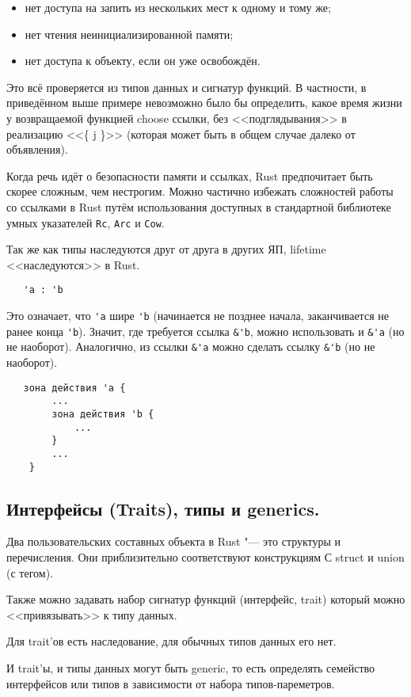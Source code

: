 \documentclass[10pt, a5paper]{article}
\begin{document}
\begin{itemize}
  \item нет доступа на запить из нескольких мест к одному и тому же;
  \item нет чтения неинициализированной памяти;
  \item нет доступа к объекту, если он уже освобождён.
\end{itemize}

Это всё проверяется из типов данных и сигнатур функций. В частности,
в приведённом выше примере невозможно было бы определить, какое время жизни у возвращаемой функцией choose ссылки, без <<подглядывания>> в реализацию <<\{ j \}>> (которая может быть в общем случае далеко от объявления).

Когда речь идёт о безопасности памяти и ссылках, Rust предпочитает быть скорее сложным, чем нестрогим. Можно частично избежать сложностей работы со ссылками в Rust путём использования доступных в стандартной библиотеке умных указателей \verb!Rc!, \verb!Arc! и \verb!Cow!.

Так же как типы наследуются друг от друга в других ЯП, lifetime <<наследуются>> в Rust.

\begin{verbatim}
   'a : 'b\end{verbatim}
Это означает, что \verb!'a! шире \verb!'b! (начинается не позднее начала, заканчивается не ранее конца \verb!'b!). Значит, где требуется ссылка \verb!&'b!,
можно использовать и \verb!&'a! (но не наоборот). Аналогично, из ссылки \verb!&'a! можно сделать ссылку \verb!&'b! (но не наоборот).

\begin{verbatim}
   зона действия 'a {
        ...
        зона действия 'b {
            ...
        }
        ...
    }\end{verbatim}
\subsection*{Интерфейсы (Traits), типы и generics.}

Два пользовательских составных объекта в Rust "--- это структуры и перечисления. Они приблизительно соответствуют конструкциям С struct и union (с тегом).

Также можно задавать набор сигнатур функций (интерфейс, trait) который можно <<привязывать>> к типу данных.

Для trait'ов есть наследование, для обычных типов данных его нет.

И trait'ы, и типы данных могут быть generic, то есть определять семейство интерфейсов или типов в зависимости от набора типов-пареметров.
\end{document}
